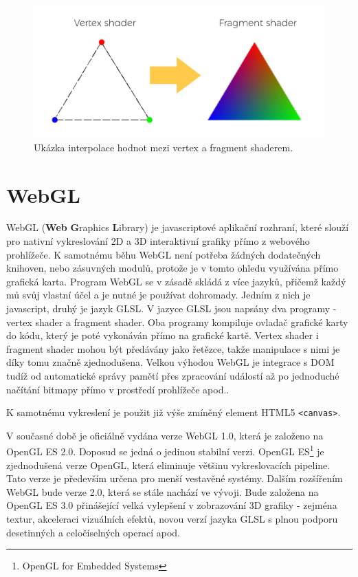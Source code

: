  
\begin{figure}[h]
	\label{img:1}
	\centering
	\includegraphics[scale=1.0,angle=0,width=1.0\linewidth]{obrazky-figures/interpolace}
	\caption{Ukázka interpolace hodnot mezi vertex a fragment shaderem.}
	\label{fig:inter}
\end{figure}
 



\newpage

\section{WebGL}
WebGL (\textbf{Web} \textbf{G}raphics \textbf{L}ibrary) je javascriptové aplikační rozhraní, které slouží pro nativní vykreslování 2D a 3D interaktivní grafiky přímo z webového prohlížeče. K samotnému běhu WebGL není potřeba žádných dodatečných knihoven, nebo zásuvných modulů, protože je v tomto ohledu využívána přímo grafická karta. Program WebGL se v zásadě skládá z více jazyků, přičemž každý mů svůj vlastní účel a je nutné je používat dohromady. Jedním z nich je javascript, druhý je jazyk GLSL. V jazyce GLSL jsou napsány dva programy - vertex shader a fragment shader. Oba programy kompiluje ovladač grafické karty do kódu, který je poté vykonáván přímo na grafické kartě. Vertex shader i fragment shader mohou být předávány jako řetězce, takže manipulace s nimi je díky tomu značně zjednodušena. Velkou výhodou WebGL je integrace s DOM tudíž od automatické správy pamětí přes zpracování událostí až po jednoduché načítání bitmapy přímo v prostředí prohlížeče apod..

K samotnému vykreslení je použit již výše zmíněný element HTML5 \texttt{<canvas>}.

V současné době je oficiálně vydána verze WebGL 1.0, která je založeno na OpenGL ES 2.0. Doposud se jedná o jedinou stabilní verzi. OpenGL ES\footnote{OpenGL for Embedded Systems} je zjednodušená verze OpenGL, která eliminuje většinu vykreslovacích pipeline. Tato verze je především určena pro menší vestavěné systémy. Dalším rozšířením WebGL bude verze 2.0, která se stále nachází ve vývoji. Bude založena na OpenGL ES 3.0 přinášející velká vylepšení v zobrazování 3D grafiky - zejména textur, akceleraci vizuálních efektů, novou verzí jazyka GLSL s plnou podporu desetinných a celočíselných operací apod.


